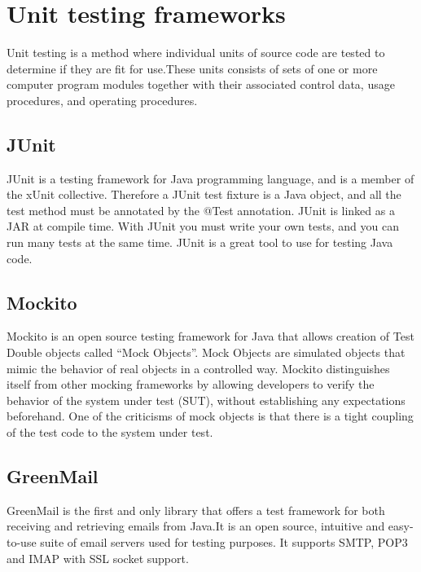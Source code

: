 \section{Unit testing frameworks}

Unit testing is a method where individual units of source code are tested to determine if they are fit for use.These units consists of sets of one or more computer program modules together with their associated control data, usage procedures, and operating procedures.

\subsection{JUnit}
JUnit is a testing framework for Java programming language, and is a member of the xUnit collective. Therefore a JUnit test fixture is a Java object, and all the test method must be annotated by the @Test annotation. JUnit is linked as a JAR at compile time. With JUnit you must write your own tests, and you can run many tests at the same time. JUnit is a great tool to use for testing Java code.

\subsection{Mockito}
Mockito is an open source testing framework for Java that allows creation of Test Double objects called “Mock Objects”. Mock Objects are simulated objects that mimic the behavior of real objects in a controlled way.
\newline
\newline
Mockito distinguishes itself from other mocking frameworks by allowing developers to verify the behavior of the system under test (SUT), without establishing any expectations beforehand.
One of the criticisms of mock objects is that there is a tight coupling of the test code to the system under test.

\subsection{GreenMail}
GreenMail is the first and only library that offers a test framework for both receiving and retrieving emails from Java.It is an open source, intuitive and easy-to-use suite of email servers used for testing purposes. It supports SMTP, POP3 and IMAP with SSL socket support.

